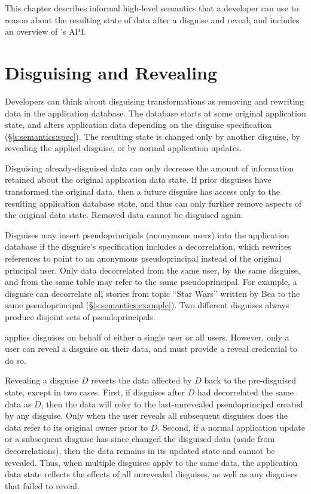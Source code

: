 This chapter describes informal high-level semantics that a developer can use to
reason about the resulting state of data after a disguise and reveal, and 
includes an overview of \sys's API.

\section{Disguising and Revealing}
\label{s:semantics:hl}
Developers can think about disguising transformations as removing and rewriting
data in the application database.
%
The database starts at some original application state, and \sys alters
application data depending on the disguise specification
(\S\ref{s:semantics:spec}).  The resulting state is changed only by another
disguise, by revealing the applied disguise, or by normal application updates.
%

%
Disguising already-disguised data can only decrease the amount of information
retained about the original application data state. If prior disguises have
transformed the original data, then a future disguise has access only to the
resulting application database state, and thus can only further remove aspects
of the original data state.
%
Removed data cannot be disguised again. 
%

Disguises may insert pseudoprincipals (anonymous users) into the application
database if the disguise's specification includes a decorrelation, which
rewrites references to point to an anonymous pseudoprincipal instead of the
original principal user. 
%
Only data decorrelated from the same user, by the same disguise, and from the
same table may refer to the same pseudoprincipal.
%
For example, a disguise can decorrelate all stories from topic ``Star Wars''
written by Bea to the same pseudoprincipal (\S\ref{s:semantics:example}).
%
Two different disguises always produce disjoint sets of pseudoprincipals.
%

%
\sys applies disguises on behalf of either a single user or all users. However,
only a user can reveal a disguise on their data, and must provide a reveal
credential to do so.
%

%
Revealing a disguise $D$ reverts the data affected by $D$ back to the
pre-disguised state, except in two cases.  
%
First, if disguises after $D$ had decorrelated the same data as $D$, then
the data will refer to the last-unrevealed pseudoprincipal created by any
disguise.
%
Only when the user reveals all subsequent disguises does the data refer to its
original owner prior to $D$.
%
Second, if a normal application update or a subsequent disguise has since
changed the disguised data (aside from decorrelations), then the data remains in
its updated state and cannot be revealed.
%
%
Thus, when multiple disguises apply to the same data, the application data state
reflects the effects of all unrevealed disguises, as well as any disguises that
\sys failed to reveal.
%

